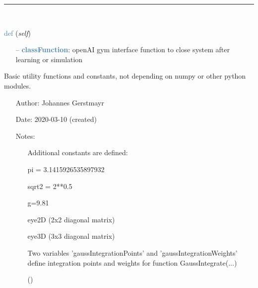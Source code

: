 \begin{itemize}[leftmargin=1.4cm]
\begin{itemize}[leftmargin=0.7cm]
\vspace{12pt}\end{itemize}
%
\noindent\rule{8cm}{0.75pt}\vspace{1pt} \\ 
\begin{flushleft}
\noindent \textcolor{steelblue}{def {\bf {}}}\label{sec:artificialIntelligence:OpenAIGymInterfaceEnv:close}
({\it self})
\end{flushleft}
\setlength{\itemindent}{0.7cm}
\begin{itemize}[leftmargin=0.7cm]
\item[--]\textcolor{steelblue}{\bf classFunction}: openAI gym interface function to close system after learning or simulation
\vspace{12pt}\end{itemize}
%
\label{sec:module:basicUtilities}
 	Basic utility functions and constants, not depending on numpy or other python modules.
\begin{itemize}[leftmargin=1.4cm]
\setlength{\itemindent}{-1.4cm}
\item[]Author:    Johannes Gerstmayr
\item[]Date:      2020-03-10 (created)
\item[]Notes:
\vspace{-22pt}\begin{itemize}[leftmargin=0.5cm]
\setlength{\itemindent}{-0.5cm}
\item[] 	Additional constants are defined: 
\item[] 			pi = 3.1415926535897932 
\item[] 			sqrt2 = 2**0.5
\item[] 			g=9.81
\item[] 			eye2D (2x2 diagonal matrix)
\item[] 			eye3D (3x3 diagonal matrix)
\item[]  			Two variables 'gaussIntegrationPoints' and 'gaussIntegrationWeights' define integration points and weights for function GaussIntegrate(...) 
\ei
\ei
\begin{flushleft}
\label{sec:basicUtilities:ClearWorkspace}
()
\end{flushleft}
\setlength{\itemindent}{0.7cm}
\begin{itemize}[leftmargin=0.7cm]

\end{itemize}
\end{itemize}
\end{itemize}
\end{itemize}
